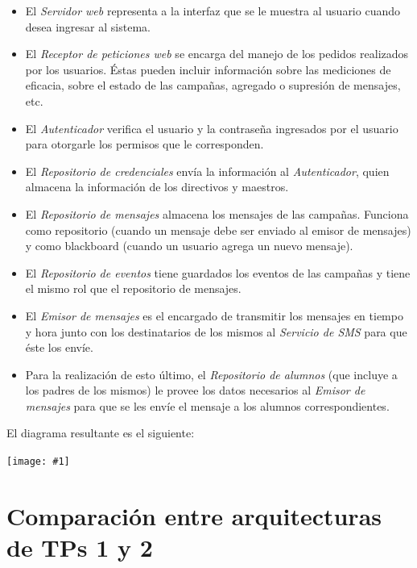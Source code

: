 \documentclass[a4paper, 10pt, twoside]{article}
\newcommand{\diagrama}[1]{
  \begin{center}
    \texttt{[image: \#1]}
  \end{center}
}
\begin{document}
\begin{itemize}
\item El \textit{Servidor web} representa a la interfaz que se le muestra al usuario cuando desea ingresar al sistema.
\item El \textit{Receptor de peticiones web} se encarga del manejo de los pedidos realizados por los usuarios. Éstas pueden incluir información sobre las mediciones de eficacia, sobre el estado de las campañas, agregado o supresión de mensajes, etc.
\item El \textit{Autenticador} verifica el usuario y la contraseña ingresados por el usuario para otorgarle los permisos que le corresponden.
\item El \textit{Repositorio de credenciales} envía la información al \textit{Autenticador}, quien almacena la información de los directivos y maestros.
\item El \textit{Repositorio de mensajes} almacena los mensajes de las campañas. Funciona como repositorio (cuando un mensaje debe ser enviado al emisor de mensajes) y como blackboard (cuando un usuario agrega un nuevo mensaje).
\item El \textit{Repositorio de eventos} tiene guardados los eventos de las campañas y tiene el mismo rol que el repositorio de mensajes.
\item El \textit{Emisor de mensajes} es el encargado de transmitir los mensajes en tiempo y hora junto con los destinatarios de los mismos al \textit{Servicio de SMS} para que éste los envíe.
\item Para la realización de esto último, el \textit{Repositorio de alumnos} (que incluye a los padres de los mismos) le provee los datos necesarios al \textit{Emisor de mensajes} para que se les envíe el mensaje a los alumnos correspondientes.
\end{itemize}

El diagrama resultante es el siguiente:

\diagrama{./diagramas/arquitecturaTP1.png}

\newpage




\section{Comparación entre arquitecturas de TPs 1 y 2}
\end{document}
